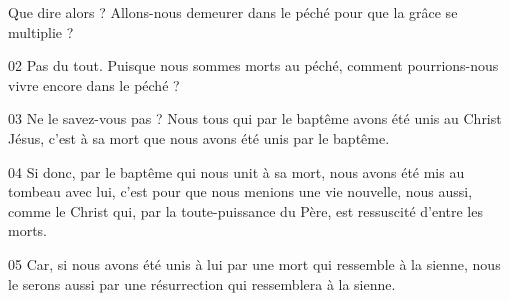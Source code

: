 Que dire alors ? Allons-nous demeurer dans le péché pour que la grâce se multiplie ?

02 Pas du tout. Puisque nous sommes morts au péché, comment pourrions-nous vivre encore dans le péché ?

03 Ne le savez-vous pas ? Nous tous qui par le baptême avons été unis au Christ Jésus, c’est à sa mort que nous avons été unis par le baptême.

04 Si donc, par le baptême qui nous unit à sa mort, nous avons été mis au tombeau avec lui, c’est pour que nous menions une vie nouvelle, nous aussi, comme le Christ qui, par la toute-puissance du Père, est ressuscité d’entre les morts.

05 Car, si nous avons été unis à lui par une mort qui ressemble à la sienne, nous le serons aussi par une résurrection qui ressemblera à la sienne.
